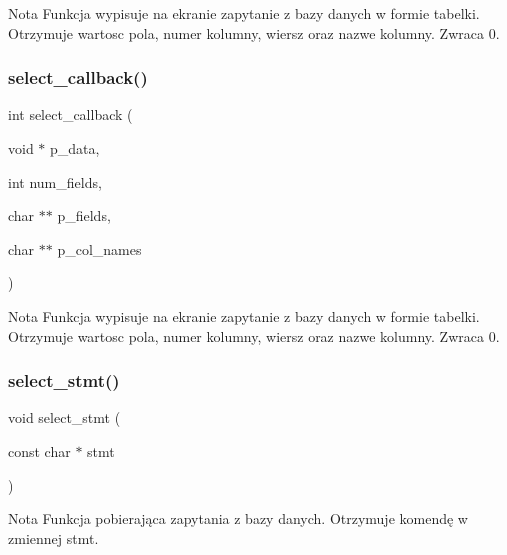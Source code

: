 \begin{DoxyCode}{0}
\end{DoxyCode}
 \begin{DoxyNote}{Nota}
Funkcja wypisuje na ekranie zapytanie z bazy danych w formie tabelki. Otrzymuje wartosc pola, numer kolumny, wiersz oraz nazwe kolumny. Zwraca 0. 
\end{DoxyNote}
\mbox{\label{client__management_8hpp_a5bf1d946e7e8a8af96d0dff113880a1a}} 
\subsubsection{select\_callback()}
{\footnotesize\ttfamily int select\+\_\+callback (\begin{DoxyParamCaption}\item[{void $\ast$}]{p\+\_\+data,  }\item[{int}]{num\+\_\+fields,  }\item[{char $\ast$$\ast$}]{p\+\_\+fields,  }\item[{char $\ast$$\ast$}]{p\+\_\+col\+\_\+names }\end{DoxyParamCaption})}


\begin{DoxyCode}{0}
\end{DoxyCode}
 \begin{DoxyNote}{Nota}
Funkcja wypisuje na ekranie zapytanie z bazy danych w formie tabelki. Otrzymuje wartosc pola, numer kolumny, wiersz oraz nazwe kolumny. Zwraca 0. 
\end{DoxyNote}
\mbox{\label{client__management_8hpp_acb1b61327008939be528a930f06fa74b}} 
\subsubsection{select\_stmt()}
{\footnotesize\ttfamily void select\+\_\+stmt (\begin{DoxyParamCaption}\item[{const char $\ast$}]{stmt }\end{DoxyParamCaption})}


\begin{DoxyCode}{0}
\end{DoxyCode}
 \begin{DoxyNote}{Nota}
Funkcja pobierająca zapytania z bazy danych. Otrzymuje komendę w zmiennej stmt. 
\end{DoxyNote}


